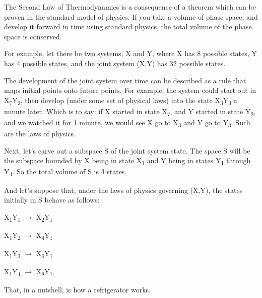 {
 The Second Law of Thermodynamics is a consequence of a theorem
which can be proven in the standard model of physics: If you take a
volume of phase space, and develop it forward in time using standard
physics, the total volume of the phase space is conserved.}

{
 For example, let there be two systems, X and Y, where X has 8
possible states, Y has 4 possible states, and the joint system (X,Y)
has 32 possible states.}

{
 The development of the joint system over time can be described as
a rule that maps initial points onto future points. For example, the
system could start out in X\textsubscript{7}Y\textsubscript{2}, then
develop (under some set of physical laws) into the state
X\textsubscript{3}Y\textsubscript{3} a minute later. Which is to say:
if X started in state X\textsubscript{7}, and Y started in state
Y\textsubscript{2}, and we watched it for 1 minute, we would see X go
to X\textsubscript{3} and Y go to Y\textsubscript{3}. Such are the laws
of physics.}

{
 Next, let's carve out a subspace S of the joint
system state. The space S will be the subspace bounded by X being in
state X\textsubscript{1} and Y being in states Y\textsubscript{1}
through Y\textsubscript{4}. So the total volume of S is 4 states.}

{
 And let's suppose that, under the laws of physics
governing (X,Y), the states initially in S behave as follows:}

{\centering
 X\textsubscript{1}Y\textsubscript{1} $\rightarrow $
X\textsubscript{2}Y\textsubscript{1}
\par}


\bigskip

{\centering
 X\textsubscript{1}Y\textsubscript{2} $\rightarrow $
X\textsubscript{4}Y\textsubscript{1}
\par}


\bigskip

{\centering
 X\textsubscript{1}Y\textsubscript{3} $\rightarrow $
X\textsubscript{6}Y\textsubscript{1}
\par}


\bigskip

{\centering
 X\textsubscript{1}Y\textsubscript{4} $\rightarrow $
X\textsubscript{8}Y\textsubscript{1}.
\par}


\bigskip

{
 That, in a nutshell, is how a refrigerator works.}

